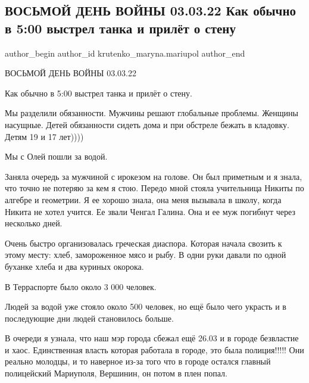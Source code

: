  
 
 
 
 

\subsection{ВОСЬМОЙ ДЕНЬ ВОЙНЫ 03.03.22 Как обычно в 5:00 выстрел танка и прилёт о стену}
\label{sec:03_03_2023.fb.krutenko_maryna.mariupol.1.vosmoj_den_03_03_vystrel_tanka_prilet_v_stenu}

\ifcmt
 author_begin
   author_id krutenko_maryna.mariupol
 author_end
\fi

ВОСЬМОЙ ДЕНЬ ВОЙНЫ 03.03.22

Как обычно в 5:00 выстрел танка и прилёт о стену. 

Мы разделили обязанности. Мужчины решают глобальные проблемы. Женщины насущные.
Детей обязанности сидеть дома и при обстреле бежать в кладовку. Детям 19 и 17
лет))))

Мы с Олей пошли за водой. 

Заняла очередь за мужчиной с ирокезом на голове. Он был приметным и я знала,
что точно не потеряю за кем я стою. Передо мной стояла учительница Никиты по
алгебре и геометрии. Я ее хорошо знала, она меня вызывала в школу, когда Никита
не хотел учится. Ее звали Ченгал Галина. Она и ее муж погибнут через несколько
дней. 

Очень быстро организовалась греческая диаспора. Которая начала свозить к этому
месту: хлеб, замороженное мясо и рыбу. В одни руки давали по одной буханке
хлеба и два куриных окорока. 

В Терраспорте было около 3 000 человек.

Людей за водой уже стояло около 500 человек, но ещё было чего украсть и в
последующие дни людей становилось больше. 

В очереди я узнала, что наш мэр города сбежал ещё 26.03 и в городе безвластие и
хаос. Единственная власть которая работала в городе, это была полиция!!!!! Они
реально молодцы, и то наверное из-за того что в городе остался главный
полицейский Мариуполя, Вершинин, он потом в плен попал. 

